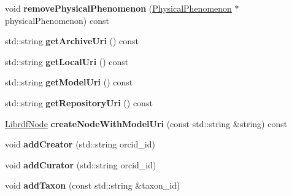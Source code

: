 \begin{DoxyCompactItemize}
\item 
\mbox{\label{classomexmeta_1_1Editor_af00f00108238acbf2b2974cedc07b454}} 
void {\bfseries remove\+Physical\+Phenomenon} (\hyperlink{classomexmeta_1_1PhysicalPhenomenon}{Physical\+Phenomenon} $\ast$physical\+Phenomenon) const
\item 
\mbox{\label{classomexmeta_1_1Editor_a736e49794c5a358f06d13d41c3657fe2}} 
std\+::string {\bfseries get\+Archive\+Uri} () const
\item 
\mbox{\label{classomexmeta_1_1Editor_a8494826923de713c19f971fd9c7908c0}} 
std\+::string {\bfseries get\+Local\+Uri} () const
\item 
\mbox{\label{classomexmeta_1_1Editor_a0020d3b9c3e91fb37c134ba8b211c13e}} 
std\+::string {\bfseries get\+Model\+Uri} () const
\item 
\mbox{\label{classomexmeta_1_1Editor_a2264cbd2efae17d1d72c3f402d8721bf}} 
std\+::string {\bfseries get\+Repository\+Uri} () const
\item 
\mbox{\label{classomexmeta_1_1Editor_a5143e1f8db82393faed322810acf5e92}} 
\hyperlink{classredland_1_1LibrdfNode}{Librdf\+Node} {\bfseries create\+Node\+With\+Model\+Uri} (const std\+::string \&string) const
\item 
\mbox{\label{classomexmeta_1_1Editor_a9c8b060005146f3cf5a231ea6789e7d7}} 
void {\bfseries add\+Creator} (std\+::string orcid\+\_\+id)
\item 
\mbox{\label{classomexmeta_1_1Editor_a8b83488faf68546733114acf54595b02}} 
void {\bfseries add\+Curator} (std\+::string orcid\+\_\+id)
\item 
\mbox{\label{classomexmeta_1_1Editor_af64f0cac6b7e27b121df94ab5b1fa217}} 
void {\bfseries add\+Taxon} (const std\+::string \&taxon\+\_\+id)
\item 
\mbox{\label{classomexmeta_1_1Editor_a533f93c8ae0c3081dfe2fc8e8ebee8ea}} 

\end{DoxyCompactItemize}
